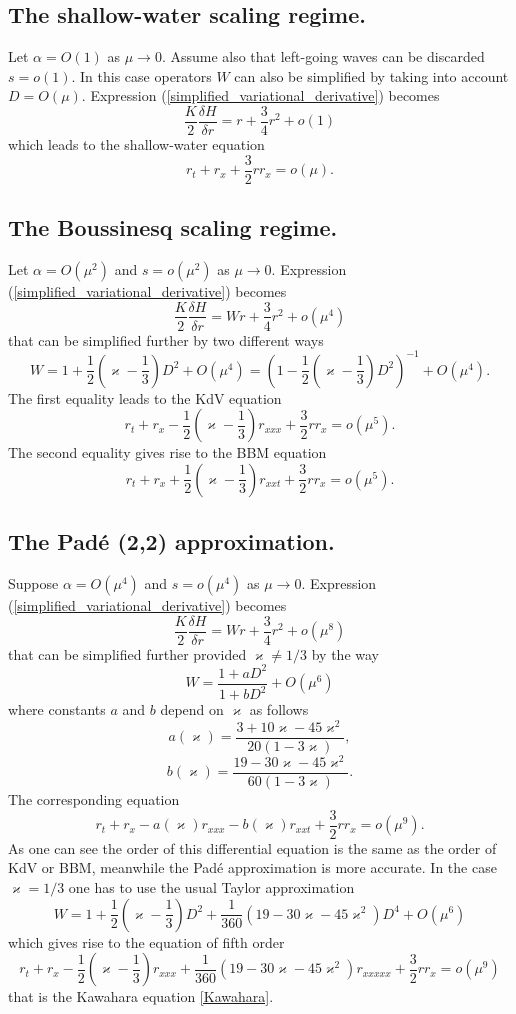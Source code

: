 \subsection{The shallow-water scaling regime.}
%
%
Let $\alpha = O(1)$ as $\mu \to 0$.
Assume also that left-going waves can be discarded $s = o(1)$.
In this case operators $W$ can also be simplified by
taking into account $D = O(\mu)$.
Expression (\ref{simplified_variational_derivative}) becomes
%
\[
	\frac{K}{2} \frac{\delta H}{\delta r}
	= r + \frac 34 r^2 + o(1)
\]
%
which leads to the shallow-water equation
%
\[
	r_t + r_x + \frac 32 r r_x = o(\mu)
	.
\]
%
%
\subsection{The Boussinesq scaling regime.}
%
%
Let $\alpha = O(\mu^2)$ and $s = o(\mu^2)$ as $\mu \to 0$.
Expression (\ref{simplified_variational_derivative}) becomes
%
\[
	\frac{K}{2} \frac{\delta H}{\delta r}
	= Wr + \frac 34 r^2 + o(\mu^4)
\]
%
that can be simplified further by two different ways
%
\[
	W = 1 + \frac 12 \left( \varkappa - \frac 13 \right) D^2 + O(\mu^4) 
	= \left( 1 - \frac 12 \left( \varkappa - \frac 13 \right) D^2 \right)
	^{-1} + O(\mu^4)
	.
\]
%
The first equality leads to the KdV equation
%
\[
	r_t + r_x - \frac 12 \left( \varkappa - \frac 13 \right) r_{xxx}
	+ \frac 32 r r_x = o(\mu^5)
	.
\]
%
The second equality gives rise to the BBM equation
%
\[
	r_t + r_x + \frac 12 \left( \varkappa - \frac 13 \right) r_{xxt}
	+ \frac 32 r r_x = o(\mu^5)
	.
\]
%
%
\subsection{The Pad\'e (2,2) approximation.}
%
%
Suppose $\alpha = O(\mu^4)$ and $s = o(\mu^4)$ as $\mu \to 0$.
Expression (\ref{simplified_variational_derivative}) becomes
%
\[
	\frac{K}{2} \frac{\delta H}{\delta r}
	= Wr + \frac 34 r^2 + o(\mu^8)
\]
%
that can be simplified further provided $\varkappa \neq 1/3$ by the way
%
\[
	W = \frac{ 1 + aD^2 }{ 1 + bD^2 } + O(\mu^6) 
\]
%
where constants $a$ and $b$ depend on $\varkappa$ as follows
%
\[
	a(\varkappa) = \frac
	{ 3 + 10 \varkappa - 45 \varkappa^2 }
	{ 20 (1 - 3 \varkappa) }
	,	
\]
%
\[
	b(\varkappa) = \frac
	{ 19 - 30 \varkappa - 45 \varkappa^2 }
	{ 60 (1 - 3 \varkappa) }
	.	
\]
%
The corresponding equation
%
\[
	r_t + r_x - a(\varkappa) r_{xxx} - b(\varkappa) r_{xxt}
	+ \frac 32 r r_x = o(\mu^9)
	.
\]
%
As one can see the order of this differential equation is the same
as the order of KdV or BBM, meanwhile the Pad\'e approximation
is more accurate.
In the case $\varkappa = 1/3$ one has to use
the usual Taylor approximation 
%
\[
	W = 1 + \frac 12 \left( \varkappa - \frac 13 \right) D^2
	+ \frac{1}{360} ( 19 - 30 \varkappa - 45 \varkappa^2 ) D^4 + O(\mu^6) 
\]
%
which gives rise to the equation of fifth order
%
\[
	r_t + r_x - \frac 12 \left( \varkappa - \frac 13 \right) r_{xxx}
	+ \frac{1}{360} ( 19 - 30 \varkappa - 45 \varkappa^2 ) r_{xxxxx}
	+ \frac 32 r r_x = o(\mu^9)
\]
that is the Kawahara equation \eqref{Kawahara}.
%
%
